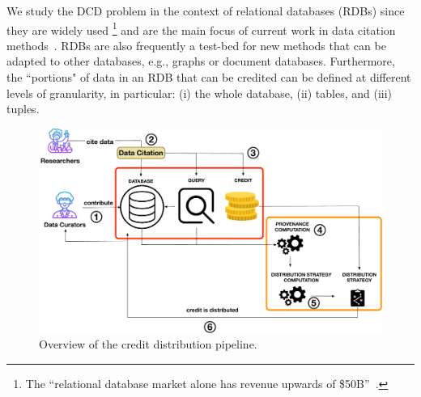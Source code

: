 

We study the DCD problem in the context of 
relational databases (RDBs) since they are widely used \footnote{The ``relational database
market alone has revenue upwards of \$50B''~\citep{AbadiEtAl2020}. } and are the main focus of current work in data citation methods~\citep{buneman2010rule,bunemann2016citation,ProllR13}.  
RDBs are also frequently a test-bed for new methods that can be adapted to other databases, e.g., graphs or document databases.
Furthermore, the ``portions" of data in an RDB that can be credited can be defined at different levels of granularity, in particular: (i) the whole database, (ii)  tables, and (iii) tuples.



\begin{figure}[]
    \centering
    \includegraphics[width=.85\textwidth]{./figures/overview}
    \caption{Overview of the credit distribution pipeline.}
\label{fig:system_overview}
\end{figure}

